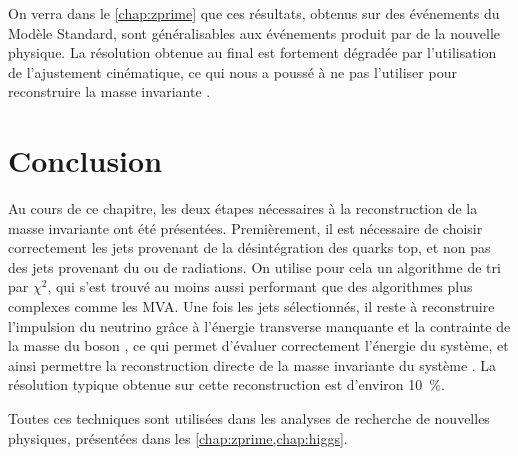 On verra dans le \cref{chap:zprime} que ces résultats, obtenus sur des événements \ttbar du Modèle Standard, sont généralisables aux événements \ttbar produit par de la nouvelle physique. La résolution obtenue au final est fortement dégradée par l'utilisation de l'ajustement cinématique, ce qui nous a poussé à ne pas l'utiliser pour reconstruire la masse invariante \ttbar.


\section{Conclusion}

Au cours de ce chapitre, les deux étapes nécessaires à la reconstruction de la masse invariante \ttbar ont été présentées. Premièrement, il est nécessaire de choisir correctement les jets provenant de la désintégration des quarks top, et non pas des jets provenant du \pu ou de radiations. On utilise pour cela un algorithme de tri par $\chi^2$, qui s'est trouvé au moins aussi performant que des algorithmes plus complexes comme les MVA. Une fois les jets sélectionnés, il reste à reconstruire l'impulsion du neutrino grâce à l'énergie transverse manquante et la contrainte de la masse du boson \PW, ce qui permet d'évaluer correctement l'énergie du système, et ainsi permettre la reconstruction directe de la masse invariante du système \ttbar. La résolution typique obtenue sur cette reconstruction est d'environ \SI{10}{\percent}.

\bigskip

Toutes ces techniques sont utilisées dans les analyses de recherche de nouvelles physiques, présentées dans les \cref{chap:zprime,chap:higgs}.